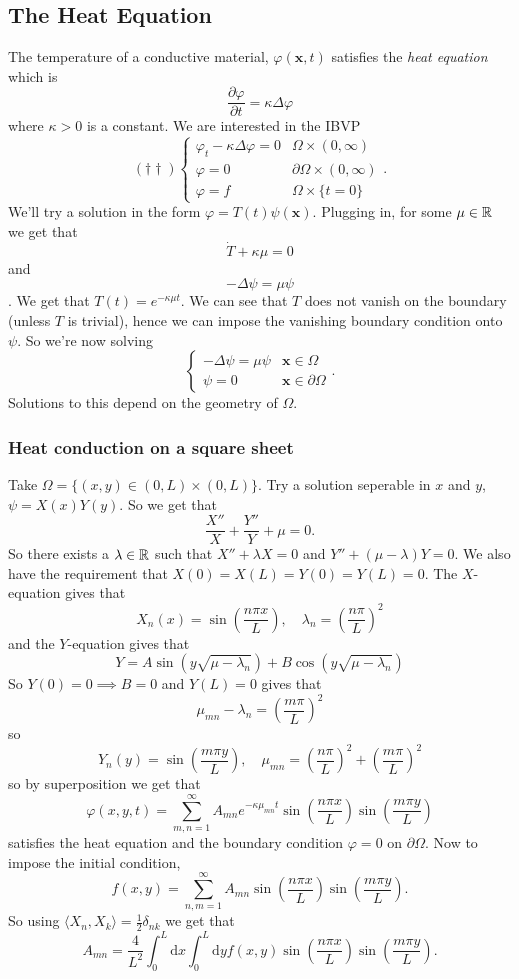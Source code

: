 \documentclass{article}
\begin{document}
\subsection{The Heat Equation}
The temperature of a conductive material, $ \varphi(\mathbf x,t) $ satisfies the \textit{heat equation} which is
\[
	\frac{\partial \varphi}{\partial t}=\kappa\Delta\varphi
\]
where $ \kappa>0 $ is a constant. We are interested in the IBVP
\[
	(\dagger\dagger) \begin{cases}
	  \varphi_t-\kappa\Delta\varphi=0 & \Omega\times (0,\infty) \\
	  \varphi = 0 & \partial\Omega\times (0,\infty) \\
	  \varphi = f & \Omega \times \{t=0\}
  \end{cases}.
\]
We'll try a solution in the form $ \varphi=T(t)\psi(\mathbf x) $. Plugging in, for some $ \mu \in \mathbb{R} $ we get that 
\[
  \dot T+\kappa\mu = 0
\]
and \[ -\Delta\psi = \mu \psi \].
We get that $ T(t)=e^{-\kappa\mu t} $. We can see that $ T $ does not vanish on the boundary (unless $ T $ is trivial), hence we can impose the vanishing boundary condition onto $ \psi $. So we're now solving
\[
  \begin{cases}
	  -\Delta\psi = \mu\psi & \mathbf x\in \Omega\\
	  \psi = 0 & \mathbf x\in \partial \Omega
  \end{cases}.
\]
Solutions to this depend on the geometry of $ \Omega $.
\subsubsection{Heat conduction on a square sheet}
Take $ \Omega=\{(x,y)\in (0,L)\times (0,L)\} $. Try a solution seperable in $ x $ and $ y $, $ \psi=X(x)Y(y) $. So we get that
\[
	\frac{X''}X+\frac{Y''}Y+\mu = 0.
\]
So there exists a $ \lambda\in \mathbb{R} $ such that $ X''+\lambda X=0 $ and $ Y''+(\mu-\lambda)Y=0 $. We also have the requirement that $ X(0)=X(L)=Y(0)=Y(L)=0 $. The $ X $-equation gives that
\[
	X_n(x)=\sin\left(\frac{n\pi x}L\right),\quad \lambda_n=\left(\frac{n\pi}L\right)^2
\]
and the $ Y $-equation gives that
\[
	Y=A\sin(y\sqrt{\mu-\lambda_n})+B\cos(y\sqrt{\mu-\lambda_n})
\]
So $ Y(0)=0\implies B=0 $ and $ Y(L)=0 $ gives that
\[
	\mu_{mn}-\lambda_n=\left(\frac{m\pi}L\right)^2
\]
so
\[
	Y_n(y)=\sin(\frac{m\pi y}L), \quad \mu_{mn}=\left(\frac{n\pi}L\right)^2+\left(\frac{m\pi}L\right)^2
\]
so by superposition we get that
\[
	\varphi(x,y,t)=\sum_{m,n=1}^\infty A_{mn}e^{-\kappa \mu_{mn}t}\sin(\frac{n\pi x}L)\sin(\frac{m\pi y}L)
\]
satisfies the heat equation and the boundary condition $ \varphi=0 $ on $ \partial \Omega $. Now to impose the initial condition,
\[
	f(x,y)=\sum_{n,m=1}^\infty A_{mn}\sin(\frac{n\pi x}L)\sin(\frac{m\pi y}L).
\]
So using $ \langle X_n,X_k\rangle =\frac 12 \delta_{nk} $ we get that
\[
	A_{mn}=\frac 4{L^2}\int_0^L\mathrm dx\int_0^L\mathrm dy f(x,y)\sin(\frac{n\pi x}L)\sin(\frac{m\pi y}L).
\]
\end{document}
